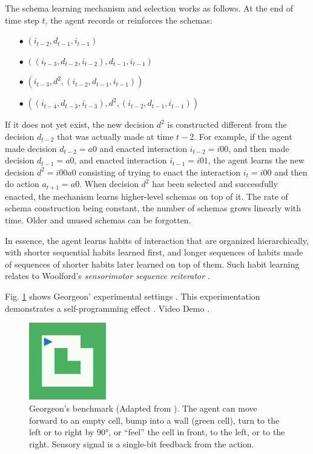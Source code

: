 \documentclass[runningheads]{llncs}
\begin{document}
The schema learning mechanism and selection works as follows.
At the end of time step $t$, the agent records or reinforces the schemas: 
\begin{itemize}
	\item[$\bullet$] $(i_{t-2}, d_{t-1}, i_{t-1})$
	\item[$\bullet$] $((i_{t-3}, d_{t-2}, i_{t-2}), d_{t-1}, i_{t-1})$
	\item[$\bullet$] $(i_{t-3}, d^2, (i_{t-2}, d_{t-1}, i_{t-1}))$
	\item[$\bullet$] $((i_{t-4}, d_{t-3}, i_{t-3}), d^2, (i_{t-2}, d_{t-1}, i_{t-1}))$
\end{itemize}

If it does not yet exist, the new decision $d^2$ is constructed different from the decision $d_{t-2}$ that was actually made at time $t-2$. 
For example, if the agent made decision $d_{t-2} = a0$ and enacted interaction $i_{t-2}=i00$, and then made decision $d_{t-1} = a0$, and enacted interaction $i_{t-1}=i01$, the agent learns the new decision $d^2=i00a0$ consisting of trying to enact the interaction $i_t=i00$ and then do action $a_{t+1}=a0$. 
When decision $d^2$ has been selected and successfully enacted, the mechanism learns higher-level schemas on top of it. 
The rate of schema construction being constant, the number of schemas grows linearly with time. 
Older and unused schemas can be forgotten.

In essence, the agent learns habits of interaction that are organized hierarchically, with shorter sequential habits learned first, and longer sequences of habits made of sequences of shorter habits later learned on top of them. 
Such habit learning relates to Woolford's \textit{sensorimotor sequence reiterator} \cite{woolford_precarious_2020}.



Fig. \ref{fig:georgeon} shows Georgeon' experimental settings \cite{georgeon_intrinsically-motivated_2012}.
This experimentation demonstrates a self-programming effect \cite{georgeon_cash_2019}.
Video Demo \cite{georgeon_video_2012}.

\begin{figure}
	\centering
	\includegraphics[width=0.3\textwidth]{Figure_grid_plot.pdf}
	\caption{Georgeon's benchmark (Adapted from \cite{georgeon_intrinsically-motivated_2012}).
		The agent can move forward to an empty cell, bump into a wall (green cell), turn to the left or to right by 90°, or ``feel'' the cell in front, to the left, or to the right. 
		Sensory signal is a single-bit feedback from the action. 	
	} 
	\label{fig:georgeon}
\end{figure}
\end{document}

